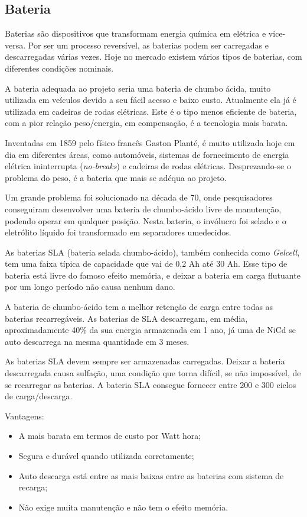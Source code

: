 \subsection{Bateria}

Baterias são dispositivos que transformam energia química em elétrica e vice-versa. Por ser um processo reversível, as baterias podem ser carregadas e descarregadas várias vezes. Hoje no mercado existem vários tipos de baterias, com diferentes condições nominais.

A bateria adequada ao projeto seria uma bateria de chumbo ácida, muito utilizada em veículos devido a seu fácil acesso e baixo custo. Atualmente ela já é utilizada em cadeiras de rodas elétricas. Este é o tipo menos eficiente de bateria, com a pior relação peso/energia, em compensação, é a tecnologia mais barata.

Inventadas em 1859 pelo físico francês Gaston Planté, é muito utilizada hoje em dia em diferentes áreas, como automóveis, sistemas de fornecimento de energia elétrica ininterrupta (\textit{no-breaks}) e cadeiras de rodas elétricas. Desprezando-se o problema do peso, é a bateria que mais se adéqua ao projeto.

Um grande problema foi solucionado na década de 70, onde pesquisadores conseguiram desenvolver uma bateria de chumbo-ácido livre de manutenção, podendo operar em qualquer posição. Nesta bateria, o invólucro foi selado e o eletrólito líquido foi transformado em separadores umedecidos.

As baterias SLA (bateria selada chumbo-ácido), também conhecida como \textit{Gelcell}, tem uma faixa típica de capacidade que vai de 0,2 Ah até 30 Ah. Esse tipo de bateria está livre do famoso efeito memória, e deixar a bateria em carga flutuante por um longo período não causa nenhum dano.

A bateria de chumbo-ácido tem a melhor retenção de carga entre todas as baterias recarregáveis. As baterias de SLA descarregam, em média, aproximadamente 40\% da sua energia armazenada em 1 ano, já uma de NiCd se auto descarrega na mesma quantidade em 3 meses.

As baterias SLA devem sempre ser armazenadas carregadas. Deixar a bateria descarregada causa sulfação, uma condição que torna difícil, se não impossível, de se recarregar as baterias. A bateria SLA consegue fornecer entre 200 e 300 ciclos de carga/descarga.

Vantagens:

\begin{itemize}
	\item A mais barata em termos de custo por Watt hora;
	\item Segura e durável quando utilizada corretamente;
	\item Auto descarga está entre as mais baixas entre as baterias com sistema de recarga;
	\item Não exige muita manutenção e não tem o efeito memória.
\end{itemize}

